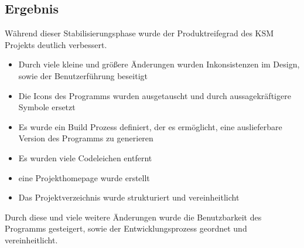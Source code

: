 \subsection{Ergebnis}

Während dieser Stabilisierungsphase wurde der Produktreifegrad des KSM Projekts deutlich verbessert. 
\begin{itemize}
\item Durch viele kleine und größere Änderungen wurden Inkonsistenzen im Design, sowie der Benutzerführung beseitigt
\item Die Icons des Programms wurden ausgetauscht und durch aussagekräftigere Symbole ersetzt
\item Es wurde ein Build Prozess definiert, der es ermöglicht, eine auslieferbare Version des Programms zu generieren
\item Es wurden viele Codeleichen entfernt
\item eine Projekthomepage wurde erstellt
\item Das Projektverzeichnis wurde strukturiert und vereinheitlicht
\end{itemize}

Durch diese und viele weitere Änderungen wurde die Benutzbarkeit des Programms gesteigert, sowie der Entwicklungsprozess geordnet und vereinheitlicht.




